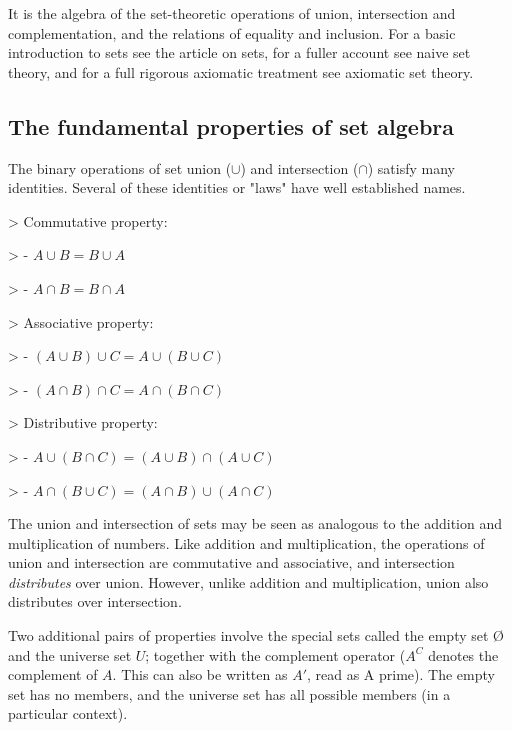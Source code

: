 It is the algebra of the set-theoretic operations of union, intersection and
complementation, and the relations of equality and inclusion. For a basic introduction to
sets see the article on sets, for a fuller account see naive set theory, and for a full
rigorous axiomatic treatment see axiomatic set theory.




\subsection{The fundamental properties of set algebra}
\label{sss:thef-fd13}




The binary operations of set union ($\cup$) and intersection ($\cap$) satisfy many
identities. Several of these identities or "laws" have well established names.



>    Commutative property:

>    - $A \cup B = B \cup A$

>    - $A \cap B = B \cap A$



> Associative property:

>    - $(A \cup B) \cup C = A \cup (B \cup C)$

>    - $(A \cap B) \cap C = A \cap (B \cap C)$



> Distributive property:

>    - $A \cup (B \cap C) = (A \cup B) \cap (A \cup C)$

>    - $A \cap (B \cup C) = (A \cap B) \cup (A \cap C)$



The union and intersection of sets may be seen as analogous to the addition and
multiplication of numbers. Like addition and multiplication, the operations of union and
intersection are commutative and associative, and intersection \textit{distributes} over
union. However, unlike addition and multiplication, union also distributes over
intersection.



Two additional pairs of properties involve the special sets called the empty set Ø and the
universe set $U$; together with the complement operator ($A^C$ denotes the complement of
$A$. This can also be written as $A'$, read as A prime). The empty set has no members, and
the universe set has all possible members (in a particular context).



